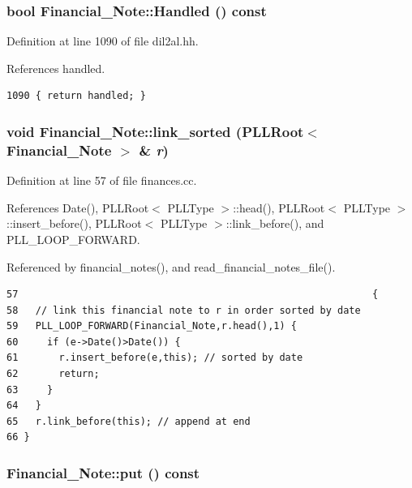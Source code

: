 \subsubsection{\setlength{\rightskip}{0pt plus 5cm}bool Financial\_\-Note::Handled () const\hspace{0.3cm}{\tt  [inline]}}\label{classFinancial__Note_a7}




Definition at line 1090 of file dil2al.hh.

References handled.



\footnotesize\begin{verbatim}1090 { return handled; }
\end{verbatim}\normalsize 
{}
\subsubsection{\setlength{\rightskip}{0pt plus 5cm}void Financial\_\-Note::link\_\-sorted ({\bf PLLRoot}$<$ Financial\_\-Note $>$ \& {\em r})}\label{classFinancial__Note_a5}




Definition at line 57 of file finances.cc.

References Date(), PLLRoot$<$ PLLType $>$::head(), PLLRoot$<$ PLLType $>$::insert\_\-before(), PLLRoot$<$ PLLType $>$::link\_\-before(), and PLL\_\-LOOP\_\-FORWARD.

Referenced by financial\_\-notes(), and read\_\-financial\_\-notes\_\-file().



\footnotesize\begin{verbatim}57                                                             {
58   // link this financial note to r in order sorted by date
59   PLL_LOOP_FORWARD(Financial_Note,r.head(),1) {
60     if (e->Date()>Date()) {
61       r.insert_before(e,this); // sorted by date
62       return;
63     }
64   }
65   r.link_before(this); // append at end
66 }
\end{verbatim}\normalsize 
{}
\subsubsection{ Financial\_\-Note::put () const}\label{classFinancial__Note_a4}




